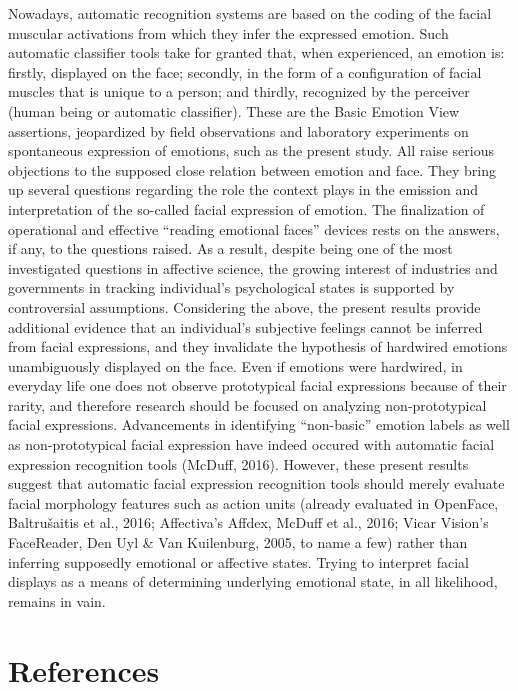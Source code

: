 \documentclass[
  english,
  doc]{apa7}
\begin{document}
Nowadays, automatic recognition systems are based on the coding of the facial muscular activations from which they infer the expressed emotion. Such automatic classifier tools take for granted that, when experienced, an emotion is: firstly, displayed on the face; secondly, in the form of a configuration of facial muscles that is unique to a person; and thirdly, recognized by the perceiver (human being or automatic classifier). These are the Basic Emotion View assertions, jeopardized by field observations and laboratory experiments on spontaneous expression of emotions, such as the present study. All raise serious objections to the supposed close relation between emotion and face. They bring up several questions regarding the role the context plays in the emission and interpretation of the so-called facial expression of emotion. The finalization of operational and effective ``reading emotional faces'' devices rests on the answers, if any, to the questions raised. As a result, despite being one of the most investigated questions in affective science, the growing interest of industries and governments in tracking individual's psychological states is supported by controversial assumptions. Considering the above, the present results provide additional evidence that an individual's subjective feelings cannot be inferred from facial expressions, and they invalidate the hypothesis of hardwired emotions unambiguously displayed on the face. Even if emotions were hardwired, in everyday life one does not observe prototypical facial expressions because of their rarity, and therefore research should be focused on analyzing non-prototypical facial expressions. Advancements in identifying ``non-basic'' emotion labels as well as non-prototypical facial expression have indeed occured with automatic facial expression recognition tools (McDuff, 2016). However, these present results suggest that automatic facial expression recognition tools should merely evaluate facial morphology features such as action units (already evaluated in OpenFace, Baltrušaitis et al., 2016; Affectiva's Affdex, McDuff et al., 2016; Vicar Vision's FaceReader, Den Uyl \& Van Kuilenburg, 2005, to name a few) rather than inferring supposedly emotional or affective states. Trying to interpret facial displays as a means of determining underlying emotional state, in all likelihood, remains in vain.

\newpage

\hypertarget{references}{%
\section{References}\label{references}}
\end{document}
